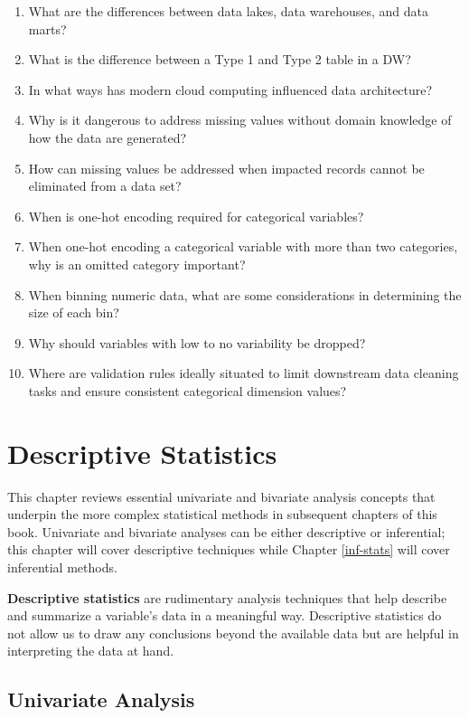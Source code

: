 \documentclass[
]{book}
\begin{document}
\begin{enumerate}
\def\labelenumi{\arabic{enumi}.}
\item
  What are the differences between data lakes, data warehouses, and data marts?
\item
  What is the difference between a Type 1 and Type 2 table in a DW?
\item
  In what ways has modern cloud computing influenced data architecture?
\item
  Why is it dangerous to address missing values without domain knowledge of how the data are generated?
\item
  How can missing values be addressed when impacted records cannot be eliminated from a data set?
\item
  When is one-hot encoding required for categorical variables?
\item
  When one-hot encoding a categorical variable with more than two categories, why is an omitted category important?
\item
  When binning numeric data, what are some considerations in determining the size of each bin?
\item
  Why should variables with low to no variability be dropped?
\item
  Where are validation rules ideally situated to limit downstream data cleaning tasks and ensure consistent categorical dimension values?
\end{enumerate}

\hypertarget{desc-stats}{%
\chapter{Descriptive Statistics}\label{desc-stats}}

This chapter reviews essential univariate and bivariate analysis concepts that underpin the more complex statistical methods in subsequent chapters of this book. Univariate and bivariate analyses can be either descriptive or inferential; this chapter will cover descriptive techniques while Chapter \ref{inf-stats} will cover inferential methods.

\textbf{Descriptive statistics} are rudimentary analysis techniques that help describe and summarize a variable's data in a meaningful way. Descriptive statistics do not allow us to draw any conclusions beyond the available data but are helpful in interpreting the data at hand.

\hypertarget{univariate-analysis}{%
\section{Univariate Analysis}\label{univariate-analysis}}
\end{document}
